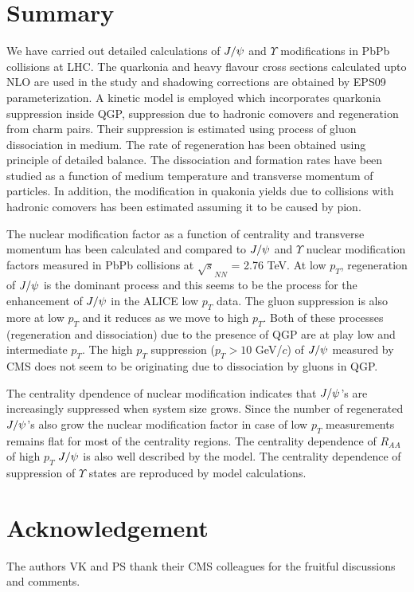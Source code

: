 \documentclass[aps,prc,preprint,superscriptaddress,showpacs,showkeys]{revtex4-1}
\begin{document}

\section{Summary}
 We have carried out detailed calculations of $J/\psi$ and $\Upsilon$ 
modifications in PbPb collisions at LHC.
  The quarkonia and heavy flavour cross sections calculated upto NLO are used in the study 
and shadowing corrections are obtained by EPS09 parameterization.
 A kinetic model is employed which incorporates quarkonia suppression inside QGP, suppression 
due to hadronic comovers and regeneration from charm pairs.
  Their suppression is estimated using process of gluon dissociation in medium. 
The rate of regeneration has been obtained using principle of detailed balance.
  The dissociation and formation rates have been studied as a function of medium temperature
and transverse momentum of particles.
 In addition, the modification in quakonia yields due to collisions with hadronic comovers
has been estimated assuming it to be caused by pion.  

  The nuclear modification factor as a function of centrality and transverse momentum has been 
calculated  and compared to $J/\psi$ and $\Upsilon$ nuclear modification factors measured in 
PbPb collisions at $\sqrt s_{NN}$ =  2.76 TeV.
  At low $p_T$, regeneration of $J/\psi$ is the dominant process and this seems to be the process
for the enhancement of $J/\psi$ in the ALICE low $p_T$ data.
  The gluon suppression is also more at low $p_T$ and it reduces as we move to high $p_T$. 
Both of these processes (regeneration and dissociation) due to the presence of QGP are 
at play low and intermediate $p_T$. The high $p_T$ suppression ($p_T > 10$  GeV/$c$) of $J/\psi$ 
measured by CMS does not seem to be originating due to dissociation by gluons in QGP.

  The centrality dpendence of nuclear modification indicates that  $J/\psi$'s are increasingly 
suppressed  when system size grows. Since the number of regenerated   $J/\psi$'s also grow the nuclear 
modification factor in case of low $p_T$ measurements remains flat for most of the centrality regions. 
 The centrality dependence of $R_{AA}$ of high $p_T$ $J/\psi$ is also well described by the model.
  The centrality dependence of suppression of $\Upsilon$ states are reproduced
by model calculations.



\section{Acknowledgement}
 The authors VK and PS thank their CMS colleagues for the fruitful discussions and comments.
\end{document}
